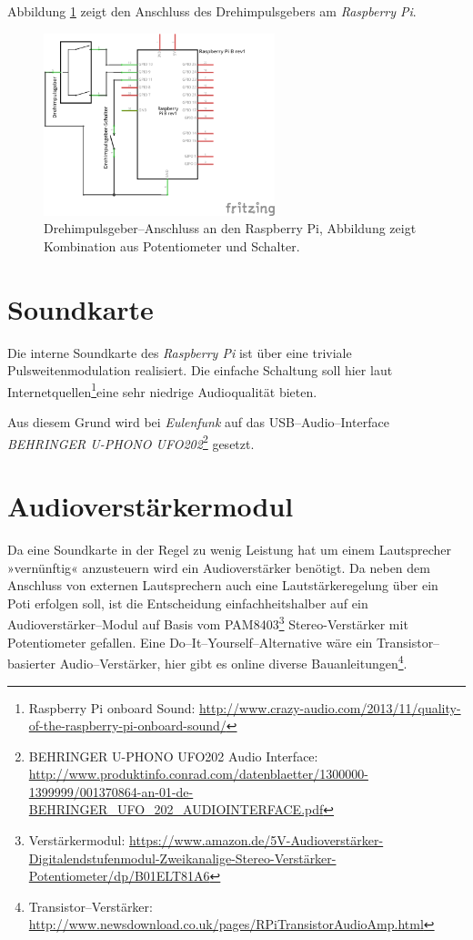 \documentclass[11pt,ngerman,toc=listof,index=totoc]{scrreprt}
\begin{document}
Abbildung \ref{alps} zeigt den Anschluss des Drehimpulsgebers am
\emph{Raspberry Pi}.

\begin{figure}[h!]
  \centering
\includegraphics[width=0.6\textwidth]{images/rotary.png}
  \caption{Drehimpulsgeber--Anschluss an den Raspberry Pi, Abbildung zeigt
  Kombination aus Potentiometer und Schalter.}
  \label{alps}
\end{figure}

\section{Soundkarte}\label{soundkarte}

Die interne Soundkarte des \emph{Raspberry Pi} ist über eine triviale
Pulsweitenmodulation realisiert. Die einfache Schaltung soll hier laut
Internetquellen\footnote{Raspberry Pi onboard Sound:
  \url{http://www.crazy-audio.com/2013/11/quality-of-the-raspberry-pi-onboard-sound/}}eine
sehr niedrige Audioqualität bieten.

Aus diesem Grund wird bei \emph{Eulenfunk} auf das USB--Audio--Interface
\emph{BEHRINGER U-PHONO UFO202}\footnote{BEHRINGER U-PHONO UFO202 Audio
  Interface:
  \url{http://www.produktinfo.conrad.com/datenblaetter/1300000-1399999/001370864-an-01-de-BEHRINGER_UFO_202_AUDIOINTERFACE.pdf}}
gesetzt.

\section{Audioverstärkermodul}\label{audioverstuxe4rkermodul}

Da eine Soundkarte in der Regel zu wenig Leistung hat um einem
Lautsprecher »vernünftig« anzusteuern wird ein Audioverstärker benötigt.
Da neben dem Anschluss von externen Lautsprechern auch eine
Lautstärkeregelung über ein Poti erfolgen soll, ist die Entscheidung
einfachheitshalber auf ein Audioverstärker--Modul auf Basis vom
PAM8403\footnote{Verstärkermodul:
  \url{https://www.amazon.de/5V-Audioverstärker-Digitalendstufenmodul-Zweikanalige-Stereo-Verstärker-Potentiometer/dp/B01ELT81A6}}
Stereo-Verstärker mit Potentiometer gefallen. Eine
Do--It--Yourself--Alternative wäre ein Transistor--basierter
Audio--Verstärker, hier gibt es online diverse Bauanleitungen\footnote{Transistor--Verstärker:
  \url{http://www.newsdownload.co.uk/pages/RPiTransistorAudioAmp.html}}.
\end{document}
